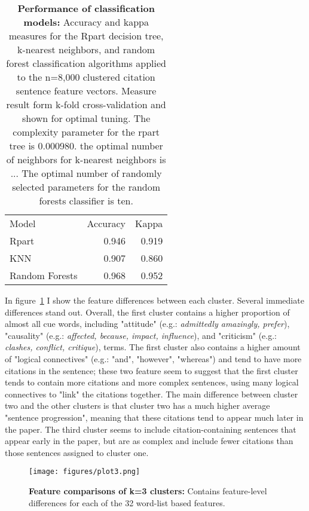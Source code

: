 \documentclass[
10pt, %
a4paper, %
oneside, %
headinclude,footinclude, %
BCOR5mm, %
]{scrartcl}
\begin{document}
\begin{table}[h]
\centering
\label{table:classifier}
\caption{\textbf{Performance of classification models:} Accuracy and kappa measures for the Rpart decision tree, k-nearest neighbors, and random forest classification algorithms applied to the n=8,000 clustered citation sentence feature vectors. Measure result form k-fold cross-validation and shown for optimal tuning. The complexity parameter for the rpart tree is 0.000980. the optimal number of neighbors for k-nearest neighbors is ... The optimal number of randomly selected parameters for the random forests classifier is ten. }
\begin{tabular}{l|r|r}
Model          & Accuracy & Kappa \\
Rpart          & 0.946    & 0.919 \\
KNN            & 0.907    & 0.860 \\
Random Forests & 0.968    & 0.952
\end{tabular}
\end{table}

In figure~\ref{fig:features_clusters} I show the feature differences between each cluster. Several immediate differences stand out. Overall, the first cluster contains a higher proportion of almost all cue words, including "attitude" (e.g.: \textit{admittedly
amazingly, prefer}), "causality" (e.g.: \textit{affected, because, impact, influence}), and "criticism" (e.g.: \textit{clashes, conflict, critique}), terms. The first cluster also contains a higher amount of "logical connectives" (e.g.: "and", "however", "whereas") and tend to have more citations in the sentence; these two feature seem to suggest that the first cluster tends to contain more citations and more complex sentences, using many logical connectives to "link" the citations together. The main difference between cluster two and the other clusters is that cluster two has a much higher average "sentence progression", meaning that these citations tend to appear much later in the paper. The third cluster seems to include citation-containing sentences that appear early in the paper, but are as complex and include fewer citations than those sentences assigned to cluster one. 


\begin{figure}[h]
	\centering
	\texttt{[image: figures/plot3.png]}
	\caption{\textbf{Feature comparisons of k=3 clusters:} Contains feature-level differences for each of the 32 word-list based features.}
	\label{fig:features_clusters}
\end{figure}
\end{document}
